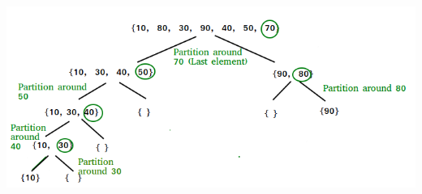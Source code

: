 \documentclass[11pt]{article} %
\begin{document}
\begin{center}
	\includegraphics[scale=0.6]{QuickSort.png}
\end{center}
\end{document}
